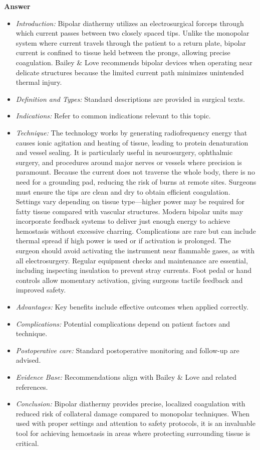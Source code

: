 \documentclass{article}
\begin{document}
\textbf{Answer}
\begin{itemize}

\item \emph{Introduction:} Bipolar diathermy utilizes an electrosurgical forceps through which current passes between two closely spaced tips. Unlike the monopolar system where current travels through the patient to a return plate, bipolar current is confined to tissue held between the prongs, allowing precise coagulation. Bailey \& Love recommends bipolar devices when operating near delicate structures because the limited current path minimizes unintended thermal injury.
\item \emph{Definition and Types:} Standard descriptions are provided in surgical texts.
\item \emph{Indications:} Refer to common indications relevant to this topic.

\item \emph{Technique:} The technology works by generating radiofrequency energy that causes ionic agitation and heating of tissue, leading to protein denaturation and vessel sealing. It is particularly useful in neurosurgery, ophthalmic surgery, and procedures around major nerves or vessels where precision is paramount. Because the current does not traverse the whole body, there is no need for a grounding pad, reducing the risk of burns at remote sites. Surgeons must ensure the tips are clean and dry to obtain efficient coagulation. Settings vary depending on tissue type—higher power may be required for fatty tissue compared with vascular structures. Modern bipolar units may incorporate feedback systems to deliver just enough energy to achieve hemostasis without excessive charring. Complications are rare but can include thermal spread if high power is used or if activation is prolonged. The surgeon should avoid activating the instrument near flammable gases, as with all electrosurgery. Regular equipment checks and maintenance are essential, including inspecting insulation to prevent stray currents. Foot pedal or hand controls allow momentary activation, giving surgeons tactile feedback and improved safety.
\item \emph{Advantages:} Key benefits include effective outcomes when applied correctly.
\item \emph{Complications:} Potential complications depend on patient factors and technique.
\item \emph{Postoperative care:} Standard postoperative monitoring and follow-up are advised.
\item \emph{Evidence Base:} Recommendations align with Bailey \& Love and related references.

\item \emph{Conclusion:} Bipolar diathermy provides precise, localized coagulation with reduced risk of collateral damage compared to monopolar techniques. When used with proper settings and attention to safety protocols, it is an invaluable tool for achieving hemostasis in areas where protecting surrounding tissue is critical.

\end{itemize}
\end{document}

